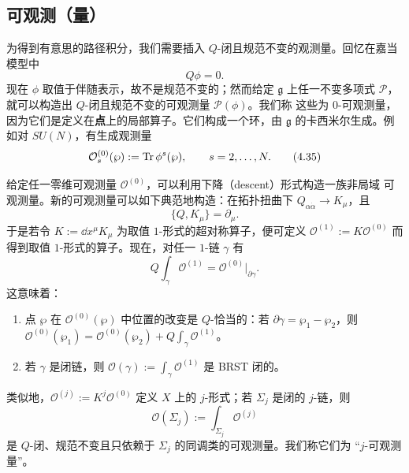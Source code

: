 \subsection{可观测（量）}
\label{sec:4-4}

为得到有意思的路径积分，我们需要插入 $Q$-闭且规范不变的观测量。回忆在嘉当模型中
\begin{equation}
  Q\phi=0 .
  \tag{4.34}
\end{equation}
现在 $\phi$ 取值于伴随表示，故不是规范不变的；然而给定 $\mathfrak{g}$ 上任一不变多项式
$\mathcal{P}$，就可以构造出 $Q$-闭且规范不变的可观测量 $\mathcal{P}(\phi)$。我们称
这些为 0-可观测量，因为它们是定义在\textbf{点}上的局部算子。它们构成一个环，由
$\mathfrak{g}$ 的卡西米尔生成。例如对 $SU(N)$，有生成观测量
\begin{equation}
  \mathcal{O}^{(0)}_{s}(\wp):=\operatorname{Tr}\phi^{s}(\wp),\qquad s=2,\dots,N .
  \tag{4.35}
\end{equation}

给定任一零维可观测量 $\mathcal{O}^{(0)}$，可以利用下降（descent）形式构造一族非局域
可观测量。新的可观测量可以如下典范地构造：在拓扑扭曲下
$Q_{\alpha\dot\alpha}\to K_{\mu}$，且
\begin{equation}
  \{Q,K_{\mu}\}=\partial_{\mu}.
  \tag{4.36}
\end{equation}
于是若令 $K:=\dd x^{\mu}K_{\mu}$ 为取值 $1$-形式的超对称算子，便可定义
$\mathcal{O}^{(1)}:=K\mathcal{O}^{(0)}$ 而得到取值 $1$-形式的算子。现在，对任一
$1$-链 $\gamma$ 有
\begin{equation}
  Q\int_{\gamma}\mathcal{O}^{(1)}
  =\mathcal{O}^{(0)}\big|_{\partial\gamma}.
  \tag{4.37}
\end{equation}
这意味着：
\begin{enumerate}[label=\arabic*., leftmargin=2.2em]
  \item 点 $\wp$ 在 $\mathcal{O}^{(0)}(\wp)$ 中位置的改变是 $Q$-恰当的：若
    $\partial\gamma=\wp_{1}-\wp_{2}$，则
    $\mathcal{O}^{(0)}(\wp_{1})=\mathcal{O}^{(0)}(\wp_{2})
    +Q\int_{\gamma}\mathcal{O}^{(1)}$。
  \item 若 $\gamma$ 是闭链，则 $\mathcal{O}(\gamma):=\int_{\gamma}\mathcal{O}^{(1)}$
    是 BRST 闭的。
\end{enumerate}
类似地，$\mathcal{O}^{(j)}:=K^{j}\mathcal{O}^{(0)}$ 定义 $X$ 上的 $j$-形式；若
$\Sigma_{j}$ 是闭的 $j$-链，则
\begin{equation}
  \mathcal{O}(\Sigma_{j}):=\int_{\Sigma_{j}}\mathcal{O}^{(j)}
  \tag{4.38}
\end{equation}
是 $Q$-闭、规范不变且只依赖于 $\Sigma_{j}$ 的同调类的可观测量。我们称它们为
“$j$-可观测量”。


